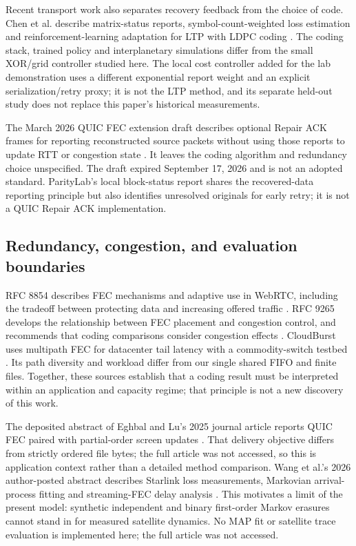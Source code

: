 \documentclass[11pt,a4paper]{article}
\begin{document}
Recent transport work also separates recovery feedback from the choice of code. Chen et al. describe matrix-status reports, symbol-count-weighted loss estimation and reinforcement-learning adaptation for LTP with LDPC coding \cite{chen2025ltp}. The coding stack, trained policy and interplanetary simulations differ from the small XOR/grid controller studied here. The local cost controller added for the lab demonstration uses a different exponential report weight and an explicit serialization/retry proxy; it is not the LTP method, and its separate held-out study does not replace this paper's historical measurements.

The March 2026 QUIC FEC extension draft describes optional Repair ACK frames for reporting reconstructed source packets without using those reports to update RTT or congestion state \cite{zheng2026fec}. It leaves the coding algorithm and redundancy choice unspecified. The draft expired September 17, 2026 and is not an adopted standard. ParityLab's local block-status report shares the recovered-data reporting principle but also identifies unresolved originals for early retry; it is not a QUIC Repair ACK implementation.

\subsection{Redundancy, congestion, and evaluation boundaries}
RFC 8854 describes FEC mechanisms and adaptive use in WebRTC, including the tradeoff between protecting data and increasing offered traffic \cite{uberti2021webrtc}. RFC 9265 develops the relationship between FEC placement and congestion control, and recommends that coding comparisons consider congestion effects \cite{kuhn2022congestion}. CloudBurst uses multipath FEC for datacenter tail latency with a commodity-switch testbed \cite{zeng2021tail}. Its path diversity and workload differ from our single shared FIFO and finite files. Together, these sources establish that a coding result must be interpreted within an application and capacity regime; that principle is not a new discovery of this work.

The deposited abstract of Eghbal and Lu's 2025 journal article reports QUIC FEC paired with partial-order screen updates \cite{eghbal2025screen}. That delivery objective differs from strictly ordered file bytes; the full article was not accessed, so this is application context rather than a detailed method comparison. Wang et al.'s 2026 author-posted abstract describes Starlink loss measurements, Markovian arrival-process fitting and streaming-FEC delay analysis \cite{wang2026loss}. This motivates a limit of the present model: synthetic independent and binary first-order Markov erasures cannot stand in for measured satellite dynamics. No MAP fit or satellite trace evaluation is implemented here; the full article was not accessed.
\end{document}
